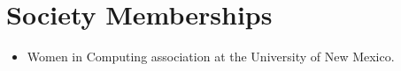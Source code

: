 \section{Society Memberships}

\begin{itemize}
  \item Women in Computing association at the University of New Mexico.
\end{itemize}


